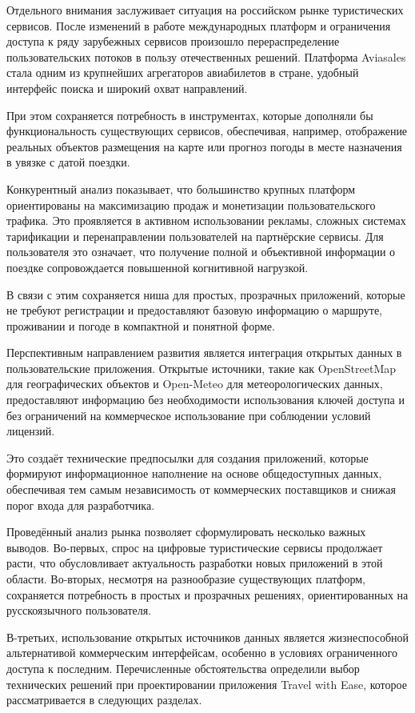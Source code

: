 \documentclass[14pt,a4paper,oneside]{extreport}
\begin{document}
Отдельного внимания заслуживает ситуация на российском рынке туристических сервисов. После изменений в работе международных платформ и ограничения доступа к ряду зарубежных сервисов произошло перераспределение пользовательских потоков в пользу отечественных решений. Платформа Aviasales стала одним из крупнейших агрегаторов авиабилетов в стране, удобный интерфейс поиска и широкий охват направлений.

При этом сохраняется потребность в инструментах, которые дополняли бы функциональность существующих сервисов, обеспечивая, например, отображение реальных объектов размещения на карте или прогноз погоды в месте назначения в увязке с датой поездки.

Конкурентный анализ показывает, что большинство крупных платформ ориентированы на максимизацию продаж и монетизации пользовательского трафика. Это проявляется в активном использовании рекламы, сложных системах тарификации и перенаправлении пользователей на партнёрские сервисы. Для пользователя это означает, что получение полной и объективной информации о поездке сопровождается повышенной когнитивной нагрузкой.

В связи с этим сохраняется ниша для простых, прозрачных приложений, которые не требуют регистрации и предоставляют базовую информацию о маршруте, проживании и погоде в компактной и понятной форме.

Перспективным направлением развития является интеграция открытых данных в пользовательские приложения. Открытые источники, такие как OpenStreetMap для географических объектов и Open-Meteo для метеорологических данных, предоставляют информацию без необходимости использования ключей доступа и без ограничений на коммерческое использование при соблюдении условий лицензий.

Это создаёт технические предпосылки для создания приложений, которые формируют информационное наполнение на основе общедоступных данных, обеспечивая тем самым независимость от коммерческих поставщиков и снижая порог входа для разработчика.

Проведённый анализ рынка позволяет сформулировать несколько важных выводов. Во-первых, спрос на цифровые туристические сервисы продолжает расти, что обусловливает актуальность разработки новых приложений в этой области. Во-вторых, несмотря на разнообразие существующих платформ, сохраняется потребность в простых и прозрачных решениях, ориентированных на русскоязычного пользователя.

В-третьих, использование открытых источников данных является жизнеспособной альтернативой коммерческим интерфейсам, особенно в условиях ограниченного доступа к последним. Перечисленные обстоятельства определили выбор технических решений при проектировании приложения Travel with Ease, которое рассматривается в следующих разделах.
\end{document}

